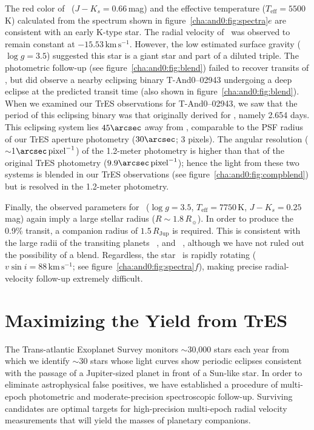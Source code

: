 The red color of \tFive\ ($J-K_{s}=0.66$\,mag) and the effective temperature ($T_{\mathrm{eff}}=5500$\,K) calculated from the spectrum shown in figure~\ref{cha:and0:fig:spectra}$e$ are consistent with an early K-type star. The radial velocity of \tFive\ was observed to remain constant at $-15.53\,\mathrm{km\,s^{-1}}$. However, the low estimated surface gravity ($\log{g}=3.5$) suggested this star is a giant star and part of a diluted triple. The photometric follow-up (see figure~\ref{cha:and0:fig:blend}) failed to recover transits of \tFive, but did observe a nearby eclipsing binary \mbox{T-And0--02943} undergoing a deep eclipse at the predicted transit time (also shown in figure~\ref{cha:and0:fig:blend}). When we examined our TrES observations for \mbox{T-And0--02943}, we saw that the period of this eclipsing binary was that originally derived for \tFive, namely 2.654 days. This eclipsing system lies $45\arcsec$ away from \tFive, comparable to the PSF radius of our TrES aperture photometry ($30\arcsec$; 3 pixels). The angular resolution ($\sim$1$\arcsec\,\mathrm{pixel}^{-1}$) of the 1.2-meter photometry is higher than that of the original TrES photometry ($9.9\arcsec\,\mathrm{pixel}^{-1}$); hence the light from these two systems is blended in our TrES observations (see figure~\ref{cha:and0:fig:compblend}) but is resolved in the 1.2-meter photometry.

Finally, the observed parameters for \tSix\ ($\log{g}=3.5$, $T_{\mathrm{eff}}=7750$\,K, $J-K_{s}=0.25$\,mag) again imply a large stellar radius ($R\sim1.8\,R_{\sun}$). In order to produce the 0.9\% transit, a companion radius of $1.5\,R_{\mathrm{Jup}}$ is required. This is consistent with the large radii of the transiting planets
 \hatponeb\ \citep{Bakos_Noyes_Kovacs:apj:2007a}, and \wasponeb\ \citep{Charbonneau_Winn_Everett:apj:2007a},
although we have not ruled out the possibility of a blend. Regardless, the star \tSix\ is rapidly rotating ($v\sin{i}=88\,\mathrm{km\,s^{-1}}$; see figure~\ref{cha:and0:fig:spectra}$f$), making precise radial-velocity follow-up extremely difficult.

\section{Maximizing the Yield from TrES}\label{cha:and0:sec:discuss}

The Trans-atlantic Exoplanet Survey monitors $\sim$30,000 stars each year from which we identify $\sim$30 stars whose light curves show periodic eclipses consistent with the passage of a Jupiter-sized planet in front of a Sun-like star. In order to eliminate astrophysical false positives, we have established a procedure of multi-epoch photometric and moderate-precision spectroscopic follow-up. Surviving candidates are optimal targets for high-precision multi-epoch radial velocity measurements that will yield the masses of planetary companions.

